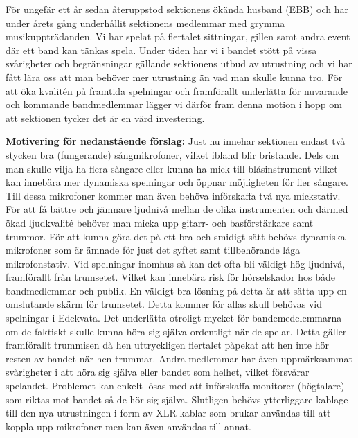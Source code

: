 \documentclass[../_main/handlingar.tex]{subfiles}
\begin{document}

För ungefär ett år sedan återuppstod sektionens ökända husband (EBB) och har under årets gång underhållit sektionens medlemmar med grymma musikuppträdanden. Vi har spelat på flertalet sittningar, gillen samt andra event där ett band kan tänkas spela. Under tiden har vi i bandet stött på vissa svårigheter och begränsningar gällande sektionens utbud av utrustning och vi har fått lära oss att man behöver mer utrustning än vad man skulle kunna tro. För att öka kvalitén på framtida spelningar och framförallt underlätta för nuvarande och kommande bandmedlemmar lägger vi därför fram denna motion i hopp om att sektionen tycker det är en värd investering.

\textbf{Motivering för nedanstående förslag:} \newline
Just nu innehar sektionen endast två stycken bra (fungerande) sångmikrofoner, vilket ibland blir bristande. Dels om man skulle vilja ha flera sångare eller kunna ha mick till blåsinstrument vilket kan innebära mer dynamiska spelningar och öppnar möjligheten för fler sångare. Till dessa mikrofoner kommer man även behöva införskaffa två nya mickstativ. \newline
För att få bättre och jämnare ljudnivå mellan de olika instrumenten och därmed ökad ljudkvalité behöver man micka upp gitarr- och basförstärkare samt trummor. För att kunna göra det på ett bra och smidigt sätt behövs dynamiska mikrofoner som är ämnade för just det syftet samt tillbehörande låga mikrofonstativ. \newline
Vid spelningar inomhus så kan det ofta bli väldigt hög ljudnivå, framförallt från trumsetet. Vilket kan innebära risk för hörselskador hos både bandmedlemmar och publik. En väldigt bra lösning på detta är att sätta upp en omslutande skärm för trumsetet. Detta kommer för allas skull behövas vid spelningar i Edekvata. \newline
Det underlätta otroligt mycket för bandemedelemmarna om de faktiskt skulle kunna höra sig själva ordentligt när de spelar. Detta gäller framförallt trummisen då hen uttryckligen flertalet påpekat att hen inte hör resten av bandet när hen trummar. Andra medlemmar har även uppmärksammat svårigheter i att höra sig själva eller bandet som helhet, vilket försvårar spelandet. Problemet kan enkelt lösas med att införskaffa monitorer (högtalare) som riktas mot bandet så de hör sig själva.
Slutligen behövs ytterliggare kablage till den nya utrustningen i form av XLR kablar som brukar användas till att koppla upp mikrofoner men kan även användas till annat.
\end{document}
